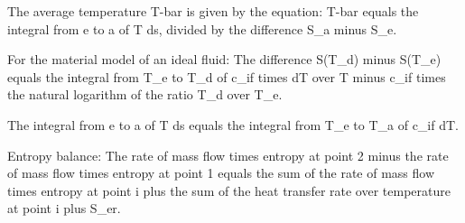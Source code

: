 The average temperature T-bar is given by the equation:
T-bar equals the integral from e to a of T ds, divided by the difference S_a minus S_e.

For the material model of an ideal fluid:
The difference S(T_d) minus S(T_e) equals the integral from T_e to T_d of c_if times dT over T minus c_if times the natural logarithm of the ratio T_d over T_e.

The integral from e to a of T ds equals the integral from T_e to T_a of c_if dT.

Entropy balance:
The rate of mass flow times entropy at point 2 minus the rate of mass flow times entropy at point 1 equals the sum of the rate of mass flow times entropy at point i plus the sum of the heat transfer rate over temperature at point i plus S_er.
